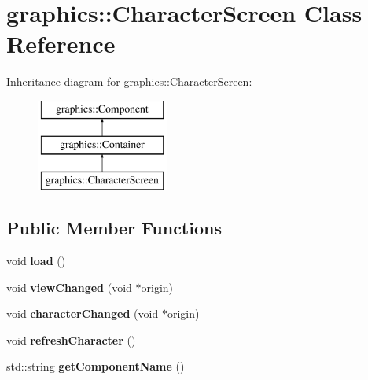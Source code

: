 \hypertarget{classgraphics_1_1_character_screen}{\section{graphics\-:\-:Character\-Screen Class Reference}
\label{classgraphics_1_1_character_screen}
}
Inheritance diagram for graphics\-:\-:Character\-Screen\-:\begin{figure}[H]
\begin{center}
\leavevmode
\includegraphics[height=3.000000cm]{classgraphics_1_1_character_screen}
\end{center}
\end{figure}
\subsection*{Public Member Functions}
\begin{DoxyCompactItemize}
\item 
\hypertarget{classgraphics_1_1_character_screen_a20cea9845beda37c5d0ad80da265e948}{void {\bfseries load} ()}\label{classgraphics_1_1_character_screen_a20cea9845beda37c5d0ad80da265e948}

\item 
\hypertarget{classgraphics_1_1_character_screen_a599e92cdb32de565c4bbee6e66ca1b51}{void {\bfseries view\-Changed} (void $\ast$origin)}\label{classgraphics_1_1_character_screen_a599e92cdb32de565c4bbee6e66ca1b51}

\item 
\hypertarget{classgraphics_1_1_character_screen_aa6f16e8dddc3711618c3bdd1f19ca0f5}{void {\bfseries character\-Changed} (void $\ast$origin)}\label{classgraphics_1_1_character_screen_aa6f16e8dddc3711618c3bdd1f19ca0f5}

\item 
\hypertarget{classgraphics_1_1_character_screen_acb2bd0096c6274a0d7a20e2236358246}{void {\bfseries refresh\-Character} ()}\label{classgraphics_1_1_character_screen_acb2bd0096c6274a0d7a20e2236358246}

\item 
\hypertarget{classgraphics_1_1_character_screen_a075e07c3b0eeee1c69b111133a43be4f}{std\-::string {\bfseries get\-Component\-Name} ()}\label{classgraphics_1_1_character_screen_a075e07c3b0eeee1c69b111133a43be4f}

\end{DoxyCompactItemize}
